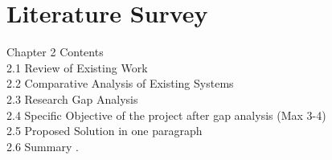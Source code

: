 \chapter{Literature Survey}\thispagestyle{thesisstyle} %
\graphicspath{{Chapter2/figures/}}
{ 




Chapter 2 Contents\\


2.1 Review of Existing Work \\
2.2 Comparative Analysis of Existing Systems \\
2.3 Research Gap Analysis \\
2.4 Specific Objective of the project after gap analysis (Max 3-4) \\
2.5 Proposed Solution in one paragraph \\
2.6 Summary .\\


}
